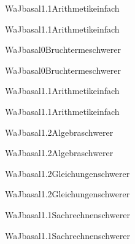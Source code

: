 \documentclass[12pt]{article}
\begin{document}
\begin{Add}{WaJ}{basal1.1}{Arithmetik}{einfach}
\solution{ }
\end{Add}
\begin{Add}{WaJ}{basal1.1}{Arithmetik}{einfach}
\end{Add}

\begin{Add}{WaJ}{basal0}{Bruchterme}{schwerer}
\solution{ }
\end{Add}
\begin{Add}{WaJ}{basal0}{Bruchterme}{schwerer}
\end{Add}

\begin{Add}{WaJ}{basal1.1}{Arithmetik}{einfach}
\solution{ }
\end{Add}
\begin{Add}{WaJ}{basal1.1}{Arithmetik}{einfach}
\end{Add}

\begin{Add}{WaJ}{basal1.2}{Algebra}{schwerer}
\solution{ }
\end{Add}
\begin{Add}{WaJ}{basal1.2}{Algebra}{schwerer}
\end{Add}

    \begin{Add}{WaJ}{basal1.2}{Gleichungen}{schwerer}
    \solution{ }
    \end{Add}
    \begin{Add}{WaJ}{basal1.2}{Gleichungen}{schwerer}
    \end{Add}
    

\begin{Add}{WaJ}{basal1.1}{Sachrechnen}{schwerer}
\solution{ }
\end{Add}
\begin{Add}{WaJ}{basal1.1}{Sachrechnen}{schwerer}
\end{Add}
\end{document}
